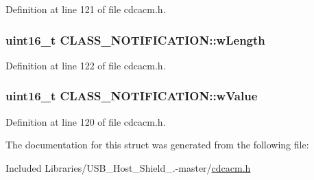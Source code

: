 \-Definition at line 121 of file cdcacm.\-h.

\hypertarget{struct_c_l_a_s_s___n_o_t_i_f_i_c_a_t_i_o_n_a7933669f6b6379d7ee0605f50422cbe2}{
\subsubsection[{w\-Length}]{\setlength{\rightskip}{0pt plus 5cm}uint16\-\_\-t {\bf \-C\-L\-A\-S\-S\-\_\-\-N\-O\-T\-I\-F\-I\-C\-A\-T\-I\-O\-N\-::w\-Length}}}\label{struct_c_l_a_s_s___n_o_t_i_f_i_c_a_t_i_o_n_a7933669f6b6379d7ee0605f50422cbe2}


\-Definition at line 122 of file cdcacm.\-h.

\hypertarget{struct_c_l_a_s_s___n_o_t_i_f_i_c_a_t_i_o_n_ab55dc65ad3f5b47da89beeaf7c03b4bc}{
\subsubsection[{w\-Value}]{\setlength{\rightskip}{0pt plus 5cm}uint16\-\_\-t {\bf \-C\-L\-A\-S\-S\-\_\-\-N\-O\-T\-I\-F\-I\-C\-A\-T\-I\-O\-N\-::w\-Value}}}\label{struct_c_l_a_s_s___n_o_t_i_f_i_c_a_t_i_o_n_ab55dc65ad3f5b47da89beeaf7c03b4bc}


\-Definition at line 120 of file cdcacm.\-h.



\-The documentation for this struct was generated from the following file\-:\begin{DoxyCompactItemize}
\item 
\-Included Libraries/\-U\-S\-B\-\_\-\-Host\-\_\-\-Shield\-\_.-\/master/\hyperlink{cdcacm_8h}{cdcacm.\-h}\end{DoxyCompactItemize}
